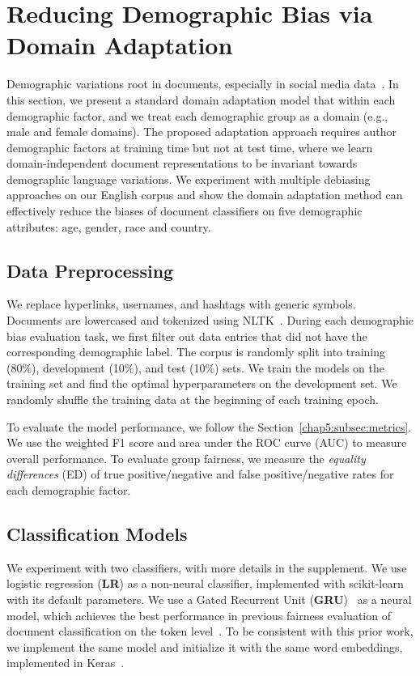 \section{Reducing Demographic Bias via Domain Adaptation}
\label{chap5:sec:adaptation}

Demographic variations root in documents, especially in social media data~\cite{volkova2013exploring, hovy2015demographic}.
In this section, we present a standard domain adaptation model that within each demographic factor, and we treat each demographic group as a domain (e.g., male and female domains).
The proposed adaptation approach requires author demographic factors at training time but not at test time, where we learn domain-independent document representations to be invariant towards demographic language variations.
We experiment with multiple debiasing approaches on our English corpus and show the domain adaptation method can effectively reduce the biases of document classifiers on five demographic attributes: age, gender, race and country.

\subsection{Data Preprocessing}
We replace hyperlinks, usernames, and hashtags with generic symbols. Documents are lowercased and tokenized using NLTK~\cite{bird2004nltk}. 
During each demographic bias evaluation task, we first filter out data entries that did not have the corresponding demographic label.
The corpus is randomly split into training (80\%), development (10\%), and test (10\%) sets. 
We train the models on the training set and find the optimal hyperparameters on the development set. 
We randomly shuffle the training data at the beginning of each training epoch. 

To evaluate the model performance, we follow the Section~\ref{chap5:subsec:metrics}.
We use the weighted F1 score and area under the ROC curve (AUC) to measure overall performance.
To evaluate {group fairness},
we measure the \textit{equality differences} (ED) of true positive/negative and false positive/negative rates for each demographic factor.


\subsection{Classification Models}

We experiment with two classifiers, with more details in the supplement.
We use logistic regression (\textbf{LR}) as a non-neural classifier,
implemented with scikit-learn~\cite{pedregosa2011scikit} with its default parameters.
We use a Gated Recurrent Unit (\textbf{GRU})~\cite{chung2014empirical} as a neural model, which achieves the best performance in previous fairness evaluation of document classification on the token level~\cite{park2018reducing}. 
To be consistent with this prior work, we implement the same model and initialize it with the same word embeddings, implemented in Keras~\cite{chollet2015keras}.


